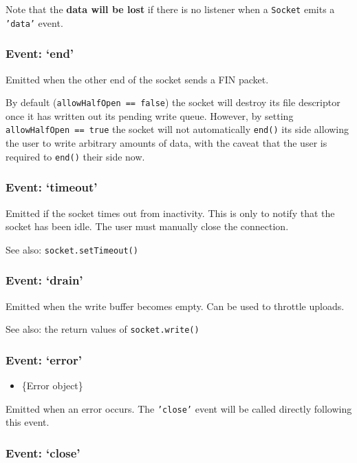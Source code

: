 Note that the \textbf{data will be lost} if there is no listener when a
\texttt{Socket} emits a \texttt{'data'} event.

\subsubsection{Event: `end'}\label{event-end}

Emitted when the other end of the socket sends a FIN packet.

By default (\texttt{allowHalfOpen == false}) the socket will destroy its
file descriptor once it has written out its pending write queue.
However, by setting \texttt{allowHalfOpen == true} the socket will not
automatically \texttt{end()} its side allowing the user to write
arbitrary amounts of data, with the caveat that the user is required to
\texttt{end()} their side now.

\subsubsection{Event: `timeout'}\label{event-timeout}

Emitted if the socket times out from inactivity. This is only to notify
that the socket has been idle. The user must manually close the
connection.

See also: \texttt{socket.setTimeout()}

\subsubsection{Event: `drain'}\label{event-drain}

Emitted when the write buffer becomes empty. Can be used to throttle
uploads.

See also: the return values of \texttt{socket.write()}

\subsubsection{Event: `error'}\label{event-error-1}

\begin{itemize}
\itemsep1pt\parskip0pt
\item
  \{Error object\}
\end{itemize}

Emitted when an error occurs. The \texttt{'close'} event will be called
directly following this event.

\subsubsection{Event: `close'}\label{event-close-1}

